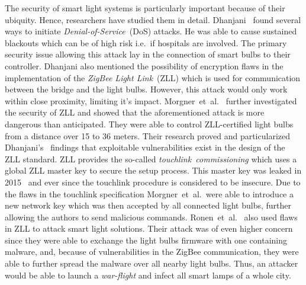 The security of smart light systems is particularly important because of their ubiquity. Hence, researchers have studied them in detail.
Dhanjani~\cite{Dhanjani:2013:HLSEPHPWLS} found several ways to initiate \textit{Denial-of-Service}~(DoS) attacks.
He was able to cause sustained blackouts which can be of high risk i.e.\ if hospitals are involved.
The primary security issue allowing this attack lay in the connection of smart bulbs to their controller.
Dhanjani also mentioned the possibility of encryption flaws in the implementation of the \textit{ZigBee Light Link}~(ZLL) which is used for communication between the bridge and the light bulbs. However, this attack would only work within close proximity, limiting it's impact.
Morgner~et~al.~\cite{Morgner:2016:AYBBUICSSCLS} further investigated the security of ZLL and showed that the aforementioned attack is more dangerous than anticipated.
They were able to control ZLL-certified light bulbs from a distance over 15 to 36 meters.
Their research proved and particularized Dhanjani's~\cite{Dhanjani:2013:HLSEPHPWLS} findings that exploitable vulnerabilities exist in the design of the ZLL standard.
ZLL provides the so-called \textit{touchlink~commissioning} which uses a global ZLL master key to secure the setup process.
This master key was leaked in 2015~\cite{Morgner:2016:AYBBUICSSCLS} and ever since the touchlink procedure is considered to be insecure.
Due to the flaws in the touchlink specification Morgner~et~al.\ were able to introduce a new network key which was then accepted by all connected light bulbs, further allowing the authors to send malicious commands.
Ronen~et~al.~\cite{Ronen:2018:IGNCZCR} also used flaws in ZLL to attack smart light solutions.
Their attack was of even higher concern since they were able to exchange the light bulbs firmware with one containing malware, and, because of vulnerabilities in the ZigBee communication, they were able to further spread the malware over all nearby light bulbs.
Thus, an attacker would be able to launch a \textit{war-flight} and infect all smart lamps of a whole city.


